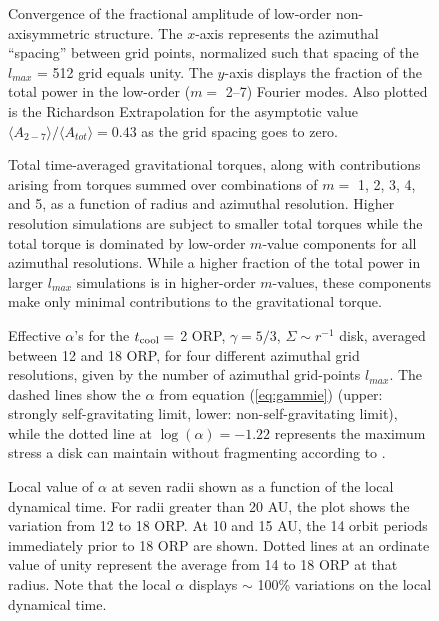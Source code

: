 \documentclass[manuscript]{aastex}
\begin{document}
\begin{figure}
\caption
{
Convergence of the fractional amplitude of low-order non-axisymmetric structure.  The $x$-axis represents
the azimuthal ``spacing'' between grid points,  normalized such that spacing of the $l_{max}$ = 512 grid
equals unity.
The $y$-axis displays the fraction of the total power in the low-order ($m = $ 2--7) Fourier modes. 
Also plotted is the Richardson Extrapolation for the asymptotic value  
$\langle A_{2-7} \rangle / \langle A_{tot} \rangle = 0.43$ as the grid spacing goes to zero.  
}
\label{fig:Power_Extrap}
\end{figure}

\begin{figure}
\caption
{
Total time-averaged gravitational  torques, along with contributions arising from torques
summed over combinations of  $m = $ 1, 2, 3, 4, and 5,
as a function of radius and azimuthal resolution. 
Higher resolution simulations are subject to smaller total torques while the total torque is dominated by low-order $m$-value
components for all azimuthal resolutions.  While a higher fraction of the total power in larger $l_{max}$ simulations is in higher-order $m$-values, these components make only minimal contributions to the gravitational torque. 
}
\label{fig:torquearray}
\end{figure}


\begin{figure}
\caption
{Effective $\alpha$'s for the $t_{\rm cool} =$ 2 ORP, $\gamma = 5/3$, $\Sigma \sim r^{ -1}$ disk, averaged between 12 and 18
  ORP, for four different azimuthal grid resolutions, given by the number of azimuthal grid-points $l_{max}$. The
  dashed lines show the $\alpha$ from equation (\ref{eq:gammie}) (upper: strongly self-gravitating limit, lower:
  non-self-gravitating limit), while the dotted line at $\log(\alpha) = -1.22$ represents the maximum stress a disk can
  maintain without fragmenting according to \citet{rice2005}. 
}
\label{fig:alpha_v_radius}
\end{figure}
\newpage

\begin{figure}
\caption{
Local value of $\alpha$ at seven radii shown as a function of the local dynamical time.  For radii greater than 20 AU, the plot shows 
the variation from 12 to 18 ORP.  At 10 and 15 AU, the 14 orbit periods immediately prior to 18 ORP are shown.
Dotted lines at an ordinate value of unity represent the average from 14 to 18 ORP at that radius.
Note that the local $\alpha$ displays $\sim$ 100\% variations on the local dynamical time. 
}
\label{fig:alphavar}
\end{figure}
\end{document}
